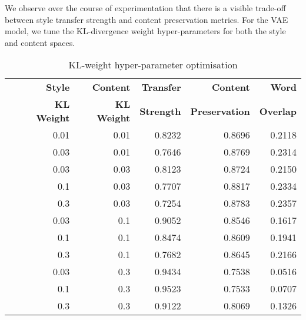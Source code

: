 We observe over the course of experimentation that there is a visible trade-off between style transfer strength and content preservation metrics. For the VAE model, we tune the KL-divergence weight hyper-parameters for both the style and content spaces.

\begin{table}[ht]
	\centering
	\begin{tabular}{| c | r | r | r | r | r |}
		\hline
		\multirow{2}{*}{
		} & \textbf{Style}     & \textbf{Content}   & \textbf{Transfer} & \textbf{Content}      & \textbf{Word}    \\
		  & \textbf{KL Weight} & \textbf{KL Weight} & \textbf{Strength} & \textbf{Preservation} & \textbf{Overlap} \\
		\hline
		\hline
		  & 0.01               & 0.01               & 0.8232            & 0.8696                & 0.2118           \\
		\hline
		  & 0.03               & 0.01               & 0.7646            & 0.8769                & 0.2314           \\
		\hline
		  & 0.03               & 0.03               & 0.8123            & 0.8724                & 0.2150           \\
		\hline
		  & 0.1                & 0.03               & 0.7707            & 0.8817                & 0.2334           \\
		\hline
		  & 0.3                & 0.03               & 0.7254            & 0.8783                & 0.2357           \\
		\hline
		  & 0.03               & 0.1                & 0.9052            & 0.8546                & 0.1617           \\
		\hline
		  & 0.1                & 0.1                & 0.8474            & 0.8609                & 0.1941           \\
		\hline
		  & 0.3                & 0.1                & 0.7682            & 0.8645                & 0.2166           \\
		\hline
		  & 0.03               & 0.3                & 0.9434            & 0.7538                & 0.0516           \\
		\hline
		  & 0.1                & 0.3                & 0.9523            & 0.7533                & 0.0707           \\
		\hline
		  & 0.3                & 0.3                & 0.9122            & 0.8069                & 0.1326           \\
		\hline
	\end{tabular}
	\caption{KL-weight hyper-parameter optimisation}
	\label{tab:kl-hyperparam-opt}
\end{table}

